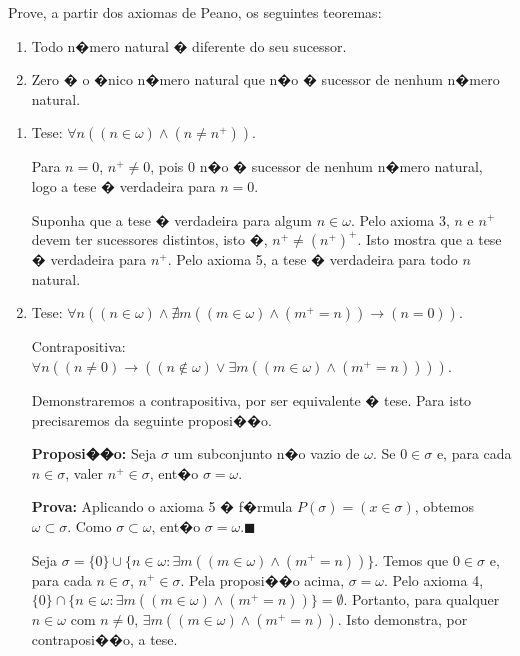 \begin{exercicio}
	Prove, a partir dos axiomas de Peano, os seguintes teoremas:
	\begin{enumerate}[label=(\alph{*})]
		\item Todo n�mero natural � diferente do seu sucessor.
		\item Zero � o �nico n�mero natural que n�o � sucessor de nenhum n�mero natural.
	\end{enumerate}
\end{exercicio}
\begin{solucao}
	\begin{enumerate}[label=(\alph{*})]
		\item Tese: $\forall n((n\in\omega)\wedge(n\neq n^+))$.
		
		Para $n=0$, $n^+\neq0$, pois $0$ n�o � sucessor de nenhum n�mero natural, logo a tese � verdadeira para $n=0$.
		
		Suponha que a tese � verdadeira para algum $n\in\omega$. Pelo axioma 3, $n$ e $n^+$ devem ter sucessores distintos, isto �, $n^+\neq(n^+)^+$. Isto mostra que a tese � verdadeira para $n^+$. Pelo axioma 5, a tese � verdadeira para todo $n$ natural.
		
		\item Tese: $\forall n((n\in\omega)\wedge\nexists m((m\in\omega)\wedge(m^+=n))\to(n=0))$.
		
		Contrapositiva: $\forall n((n\neq0)\to((n\notin\omega)\vee\exists m((m\in\omega)\wedge(m^+=n))))$.
		
		Demonstraremos a contrapositiva, por ser equivalente � tese. Para isto precisaremos da seguinte proposi��o.
		
		\textbf{Proposi��o:} Seja $\sigma$ um subconjunto n�o vazio de $\omega$. Se $0\in\sigma$ e, para cada $n\in\sigma$, valer $n^+\in\sigma$, ent�o $\sigma=\omega$.
		
		\textbf{Prova:} Aplicando o axioma 5 � f�rmula $P(\sigma)=(x\in\sigma)$, obtemos $\omega\subset \sigma$. Como $\sigma\subset \omega$, ent�o $\sigma=\omega$.\hfill$\blacksquare$
		
		Seja $\sigma=\{0\}\cup\{n\in\omega:\exists m((m\in\omega)\wedge(m^+=n))\}$. Temos que $0\in\sigma$ e, para cada $n\in\sigma$, $n^+\in\sigma$. Pela proposi��o acima, $\sigma=\omega$. Pelo axioma 4, $\{0\}\cap\{n\in\omega:\exists m((m\in\omega)\wedge(m^+=n))\}=\emptyset$. Portanto, para qualquer $n\in\omega$ com $n\neq0$, $\exists m((m\in\omega)\wedge(m^+=n))$. Isto demonstra, por contraposi��o, a tese.
	\end{enumerate}
\end{solucao}

